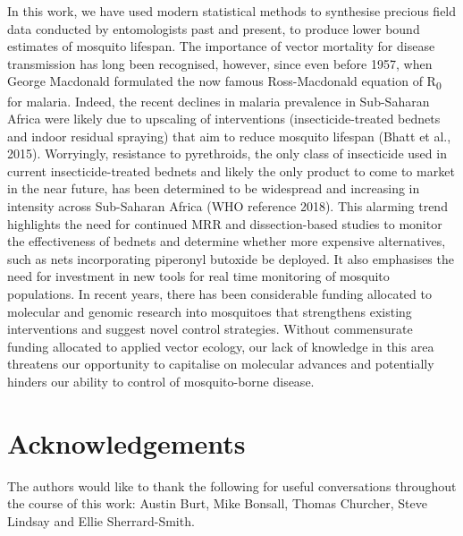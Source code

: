 \documentclass[]{article}
\begin{document}
In this work, we have used modern statistical methods to synthesise precious field data conducted by entomologists past and present, to produce lower bound estimates of mosquito lifespan. The importance of vector mortality for disease transmission has long been recognised, however,
since even before 1957, when George Macdonald formulated the
now famous Ross-Macdonald equation of R\textsubscript{0} for malaria. Indeed, the recent declines in malaria prevalence in Sub-Saharan Africa were likely due to upscaling of interventions (insecticide-treated bednets and indoor residual spraying) that aim to reduce mosquito lifespan (Bhatt et al., 2015). Worryingly, resistance to pyrethroids, the only class of insecticide used in current insecticide-treated bednets and likely the only product to come to market in the near
future, has been determined to be widespread and increasing in intensity
across Sub-Saharan Africa (WHO reference 2018). This alarming trend
highlights the need for continued MRR and dissection-based studies to
monitor the effectiveness of bednets and determine whether more
expensive alternatives, such as nets incorporating piperonyl butoxide be
deployed. It also emphasises the need for investment in new tools for
real time monitoring of mosquito populations. In recent years, there has been considerable funding allocated to molecular and genomic research
into mosquitoes that strengthens existing interventions and suggest
novel control strategies. Without commensurate funding allocated to
applied vector ecology, our lack of knowledge in this area threatens our
opportunity to capitalise on molecular advances and potentially hinders
our ability to control of mosquito-borne disease.

\section{Acknowledgements}\label{acknowledgements}

The authors would like to thank the following for useful conversations
throughout the course of this work: Austin Burt, Mike Bonsall, Thomas Churcher, Steve
Lindsay and Ellie Sherrard-Smith.
\end{document}
